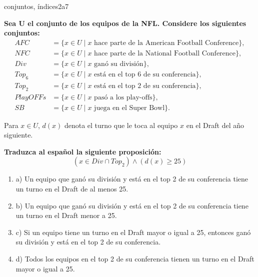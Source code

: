 \documentclass{article}
\begin{document}
\begin{question}{23}{conjuntos, índices}{2}{a}{7}{
\textbf{Sea U el conjunto de los equipos de la NFL. Considere los siguientes conjuntos:}
\[
\begin{aligned}
AFC &= \{ x \in U \mid x \text{ hace parte de la American Football Conference}\},\\
NFC &= \{ x \in U \mid x \text{ hace parte de la National Football Conference}\},\\
Div &= \{ x \in U \mid x \text{ ganó su división}\},\\
Top_6 &= \{ x \in U \mid x \text{ está en el top 6 de su conferencia}\},\\
Top_2 &= \{ x \in U \mid x \text{ está en el top 2 de su conferencia}\},\\
PlayOFFs &= \{ x \in U \mid x \text{ pasó a los play-offs}\},\\
SB &= \{ x \in U \mid x \text{ juega en el Super Bowl}\}.
\end{aligned}
\]

Para $x \in U$, $d(x)$ denota el turno que le toca al equipo $x$ en el Draft del año siguiente. \medskip

\textbf{Traduzca al español la siguiente proposición:}
\[
(x \in Div \cap Top_2)\land(d(x) \geq 25)
\]

\begin{enumerate}
    \item a) Un equipo que ganó su división y está en el top 2 de su conferencia tiene un turno en el Draft de al menos 25.  
    \item b) Un equipo que ganó su división y está en el top 2 de su conferencia tiene un turno en el Draft menor a 25.  
    \item c) Si un equipo tiene un turno en el Draft mayor o igual a 25, entonces ganó su división y está en el top 2 de su conferencia.  
    \item d) Todos los equipos en el top 2 de su conferencia tienen un turno en el Draft mayor o igual a 25.  
\end{enumerate}
}
\end{question}
\end{document}
